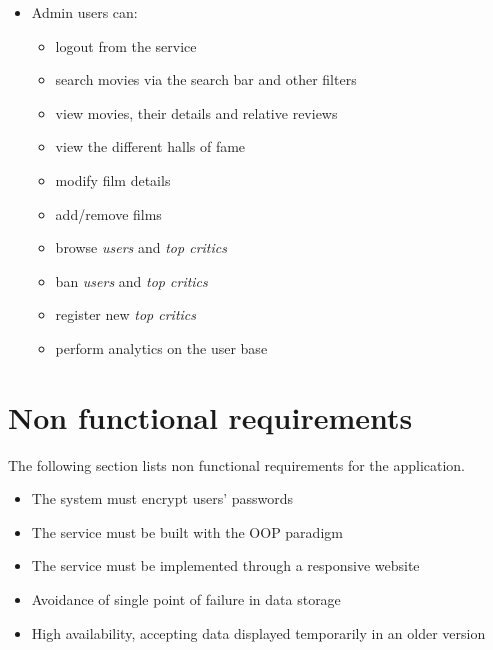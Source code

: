 \begin{itemize}
\begin{itemize}
	\end{itemize}
	\item Admin users can:
	\begin{itemize}
		\item logout from the service
		\item search movies via the search bar and other filters
		\item view movies, their details and relative reviews
		\item view the different halls of fame
		\item modify film details
		\item add/remove films
		\item browse \emph{users} and \emph{top critics}
		\item ban \emph{users} and \emph{top critics}
		\item register new \emph{top critics}
		\item perform analytics on the user base
		
	\end{itemize}
\end{itemize}

\section{Non functional requirements}
The following section lists non functional requirements for the application.
\begin{itemize}
	\item The system must encrypt users' passwords
	\item The service must be built with the OOP paradigm
	\item The service must be implemented through a responsive website
	\item Avoidance of single point of failure in data storage
	\item High availability, accepting data displayed temporarily in an older version
\end{itemize}

